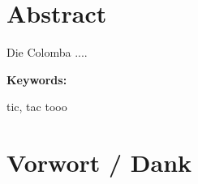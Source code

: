 \section*{Abstract}
Die Colomba ....

\vspace{2ex}

\textbf{Keywords:}

tic, tac tooo

\clearpage

\section*{Vorwort / Dank}


